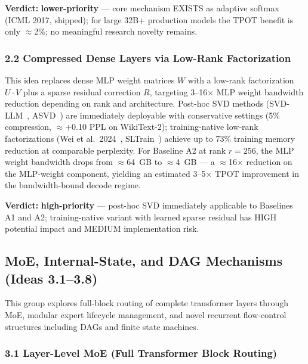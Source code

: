 \documentclass[11pt]{article}
\begin{document}
\textbf{Verdict:} \textbf{lower-priority} --- core mechanism EXISTS as adaptive softmax (ICML 2017, shipped); for large 32B+ production models the TPOT benefit is only $\approx$2\%; no meaningful research novelty remains.

\subsubsection{2.2 Compressed Dense Layers via Low-Rank Factorization}
\label{sec:idea_2_2}

This idea replaces dense MLP weight matrices $W$ with a low-rank factorization $U \cdot V$ plus a sparse residual correction $R$, targeting 3--16$\times$ MLP weight bandwidth reduction depending on rank and architecture.
Post-hoc SVD methods (SVD-LLM~\cite{Wang2024SVDLLM}, ASVD~\cite{Yuan2023ASVD}) are immediately deployable with conservative settings (5\% compression, $\approx$+0.10 PPL on WikiText-2); training-native low-rank factorizations (Wei et al.~2024~\cite{Wei2024LowRank}, SLTrain~\cite{Han2024SLTrain}) achieve up to 73\% training memory reduction at comparable perplexity.
For Baseline A2 at rank $r = 256$, the MLP weight bandwidth drops from $\approx$64~GB to $\approx$4~GB --- a $\approx$16$\times$ reduction on the MLP-weight component, yielding an estimated 3--5$\times$ TPOT improvement in the bandwidth-bound decode regime.

\textbf{Verdict:} \textbf{high-priority} --- post-hoc SVD immediately applicable to Baselines A1 and A2; training-native variant with learned sparse residual has HIGH potential impact and MEDIUM implementation risk.

\subsection{MoE, Internal-State, and DAG Mechanisms (Ideas 3.1--3.8)}
\label{sec:group3}

This group explores full-block routing of complete transformer layers through MoE, modular expert lifecycle management, and novel recurrent flow-control structures including DAGs and finite state machines.

\subsubsection{3.1 Layer-Level MoE (Full Transformer Block Routing)}
\label{sec:idea_3_1}
\end{document}
